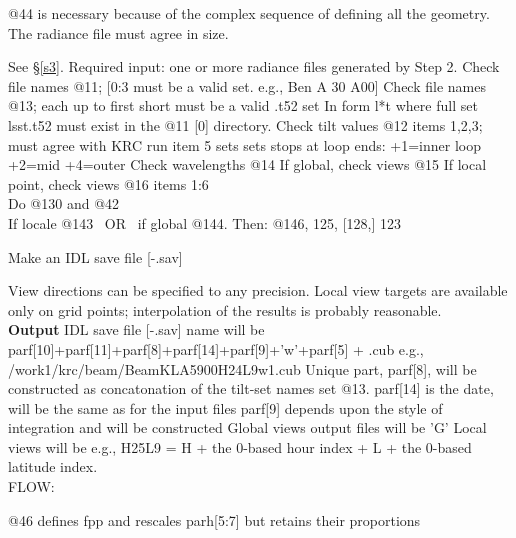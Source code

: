 \documentclass{article}
\begin{document}
@44 is necessary because of the complex sequence of defining all the geometry. The radiance file must agree in size.

See \S \ref{s3}. Required input: one or more radiance files generated by Step 2.
\qi Check file names @11; [0:3 must be a valid set. e.g., Ben A 30 A00]
\qi Check file names @13; each up to first short must be a valid .t52 set
\qii  In form l*t where full set lsst.t52 must exist in the @11 [0] directory.
\qi Check tilt values @12 items 1,2,3; must agree with KRC run
\qii item 5 sets sets stops at loop ends:  +1=inner loop +2=mid +4=outer
\qi Check wavelengths @14
\qi If global, check views @15
\qi If local point, check views @16 items 1:6 
\\ Do  @130 and @42 
\\ If locale @143 \  OR \ if global @144.  Then:  @146, 125, [128,] 123

Make an IDL save file [-.sav] 
 
View directions can be specified to any precision. Local view targets are
available only on grid points; interpolation of the results is probably
reasonable.
\\ \textbf{Output}  IDL save file [-.sav] 
\qi  name will be  parf[10]+parf[11]+parf[8]+parf[14]+parf[9]+'w'+parf[5]  + .cub
\qiii e.g., /work1/krc/beam/BeamKLA5900H24L9w1.cub
\qii Unique part, parf[8], will be constructed as concatonation of the tilt-set names set @13.
\qii parf[14] is the date, will be the same as for the input files
\qii parf[9] depends upon the style of integration and will be constructed
\qiii  Global views output files will be 'G' 
\qiii Local views will be  e.g., H25L9 =  H + the 0-based hour index + L + the 0-based latitude index.
\\ FLOW:

 @46 defines fpp and rescales parh[5:7] but retains their proportions
\end{document}
